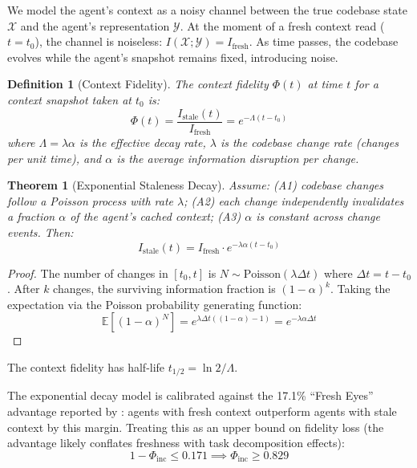 \documentclass[11pt, a4paper, logo, copyright]{googledeepmind}
\newtheorem{definition}{Definition}[section]
\newtheorem{theorem}{Theorem}[section]
\begin{document}
We model the agent's context as a noisy channel between the true codebase state $\mathcal{X}$ and the agent's representation $\mathcal{Y}$. At the moment of a fresh context read ($t = t_0$), the channel is noiseless: $I(\mathcal{X}; \mathcal{Y}) = I_{\mathrm{fresh}}$. As time passes, the codebase evolves while the agent's snapshot remains fixed, introducing noise.

\begin{definition}[Context Fidelity]
\label{def:fidelity}
The context fidelity $\Phi(t)$ at time $t$ for a context snapshot taken at $t_0$ is:
\begin{equation}
    \Phi(t) = \frac{I_{\mathrm{stale}}(t)}{I_{\mathrm{fresh}}} = e^{-\Lambda(t - t_0)}
\end{equation}
where $\Lambda = \lambda \alpha$ is the effective decay rate, $\lambda$ is the codebase change rate (changes per unit time), and $\alpha$ is the average information disruption per change.
\end{definition}

\begin{theorem}[Exponential Staleness Decay]
\label{thm:staleness}
Assume: (A1) codebase changes follow a Poisson process with rate $\lambda$; (A2) each change independently invalidates a fraction $\alpha$ of the agent's cached context; (A3) $\alpha$ is constant across change events. Then:
\begin{equation}
    I_{\mathrm{stale}}(t) = I_{\mathrm{fresh}} \cdot e^{-\lambda\alpha(t - t_0)}
\end{equation}
\end{theorem}

\begin{proof}
The number of changes in $[t_0, t]$ is $N \sim \mathrm{Poisson}(\lambda\Delta t)$ where $\Delta t = t - t_0$. After $k$ changes, the surviving information fraction is $(1-\alpha)^k$. Taking the expectation via the Poisson probability generating function:
\begin{equation}
    \mathbb{E}[(1-\alpha)^N] = e^{\lambda\Delta t((1-\alpha) - 1)} = e^{-\lambda\alpha\Delta t}
\end{equation}
\end{proof}

The context fidelity has half-life $t_{1/2} = \ln 2 / \Lambda$.

The exponential decay model is calibrated against the 17.1\% ``Fresh Eyes'' advantage reported by \citet{suzgun2024metaprompting}: agents with fresh context outperform agents with stale context by this margin. Treating this as an upper bound on fidelity loss (the advantage likely conflates freshness with task decomposition effects):
\begin{equation}
    1 - \Phi_{\mathrm{inc}} \leq 0.171 \implies \Phi_{\mathrm{inc}} \geq 0.829
\end{equation}
\end{document}

